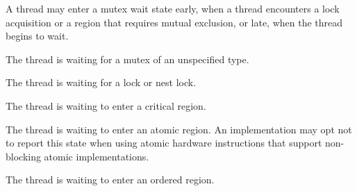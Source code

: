A thread may enter a mutex wait state early, when a thread encounters a lock
acquisition or a region that requires mutual exclusion, or late, when the
thread begins to wait.


\begin{description}

\item {}

  The thread is waiting for a mutex of an unspecified type. 

\item {}

  The thread is waiting for a  lock  or nest lock. 

\item {}

  The thread is waiting to enter a critical region. 


\item {}

  The thread is waiting to enter an atomic region. 
  An implementation may opt not to report
  this state when using atomic hardware instructions that support non-blocking atomic implementations.


\item {}

  The thread is waiting to enter an ordered region. 

\end{description}

